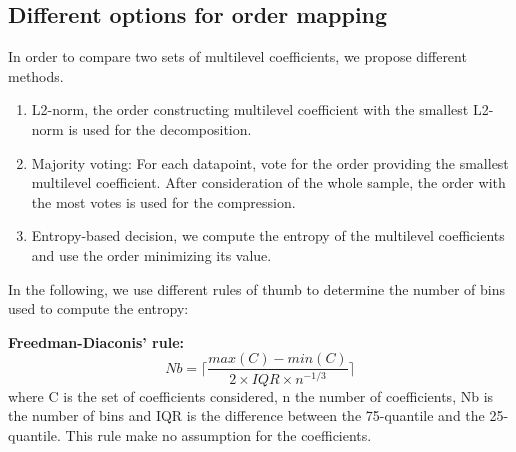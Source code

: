 \documentclass[conference]{IEEEtran}
\theoremstyle{remark}
\begin{document}

\subsection{Different options for order mapping}
In order to compare two sets of multilevel coefficients, we propose different methods.
\begin{enumerate}
\item L2-norm, the order constructing multilevel coefficient with the smallest L2-norm is used for the decomposition.
  \item Majority voting: For each datapoint, vote for the order providing the smallest multilevel coefficient. After consideration of the whole sample, the order with the most votes is used for the compression.
  \item Entropy-based decision, we compute the entropy of the multilevel coefficients and use the order minimizing its value.
  \end{enumerate}

In the following, we use different rules of thumb to determine the number of bins used to compute the entropy:

\textbf{Freedman-Diaconis' rule:}
\[Nb = \lceil \frac{max(C)-min(C)}{2\times IQR \times n^{-1/3}} \rceil \]
where C is the set of coefficients considered, n the number of coefficients,  Nb is the number of bins and IQR is the difference between the 75-quantile and the 25-quantile.
This rule make no assumption for the coefficients.
\end{document}
